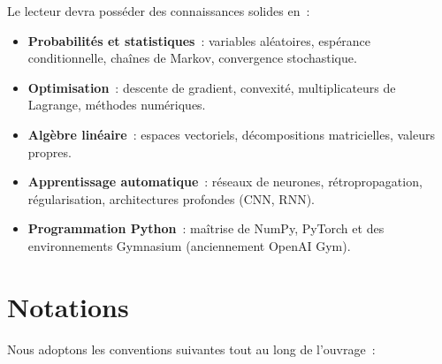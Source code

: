 Le lecteur devra poss\'eder des connaissances solides en~:

\begin{itemize}
    \item \textbf{Probabilit\'es et statistiques}~: variables al\'eatoires, esp\'erance
    conditionnelle, cha\^ines de Markov, convergence stochastique.

    \item \textbf{Optimisation}~: descente de gradient, convexit\'e, multiplicateurs de
    Lagrange, m\'ethodes num\'eriques.

    \item \textbf{Alg\`ebre lin\'eaire}~: espaces vectoriels, d\'ecompositions matricielles,
    valeurs propres.

    \item \textbf{Apprentissage automatique}~: r\'eseaux de neurones, r\'etropropagation,
    r\'egularisation, architectures profondes (CNN, RNN).

    \item \textbf{Programmation Python}~: ma\^itrise de NumPy, PyTorch et des
    environnements Gymnasium (anciennement OpenAI Gym).
\end{itemize}

\section*{Notations}

Nous adoptons les conventions suivantes tout au long de l'ouvrage~:


